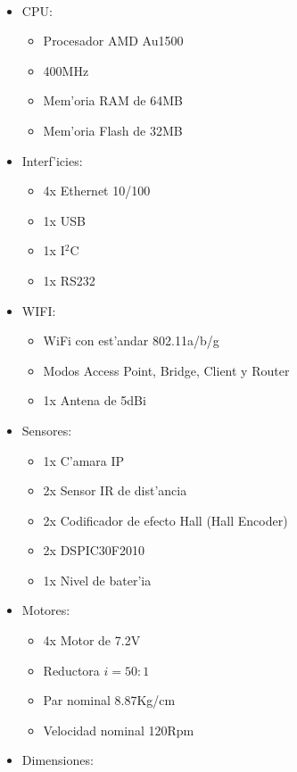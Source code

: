 \documentclass[twoside,12pt]{article}
\begin{document}
\paragraph*{}

\begin{multicols}{2}
\begin{itemize}
\item CPU:
	\begin{itemize}
	\item Procesador AMD Au1500
	\item 400MHz
	\item Mem'oria RAM de 64MB
	\item Mem'oria Flash de 32MB
	\end{itemize}
\item Interf'icies:
	\begin{itemize}
	\item 4x Ethernet 10/100
	\item 1x USB
	\item 1x I$^{2}$C %
	\item 1x RS232
	\end{itemize}
\item WIFI:
	\begin{itemize}
	\item WiFi con est'andar 802.11a/b/g
	\item Modos Access Point, Bridge, Client y Router
	\item 1x Antena de 5dBi
	\end{itemize}
\item Sensores:
	\begin{itemize}
	\item 1x C'amara IP
	\item 2x Sensor IR de dist'ancia
	\item 2x Codificador de efecto Hall (Hall Encoder) 
	\item 2x DSPIC30F2010
	\item 1x Nivel de bater'ia
	\end{itemize}
\item Motores:
	\begin{itemize}
	\item 4x Motor de 7.2V
	\item Reductora $i=50:1$
	\item Par nominal 8.87Kg/cm
	\item Velocidad nominal 120Rpm
	\end{itemize}
\item Dimensiones:
	\begin{itemize}

\end{itemize}
\end{itemize}
\end{multicols}
\end{document}
